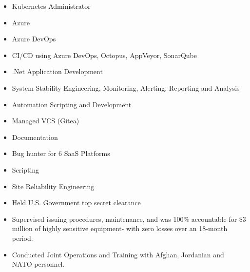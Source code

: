 \documentclass[10pt,a4paper,ragged2e,withhyper]{altacv}
\begin{document}


\makecvheader


\begin{paracol}{2}

\begin{itemize}
\item Kubernetes Administrator  
\item Azure
\item Azure DevOps
\item CI/CD using Azure DevOps, Octopus, AppVeyor, SonarQube
\item .Net Application Development
\item System Stability Engineering, Monitoring, Alerting, Reporting and Analysis
\item Automation Scripting and Development
\item Managed VCS (Gitea)
\item Documentation
\end{itemize}

\divider

\begin{itemize}
\item Bug hunter for 6 SaaS Platforms
\item Scripting
\item Site Reliability Engineering
\end{itemize}

\divider

\begin{itemize}
\item Held U.S. Government top secret clearance
\item Supervised issuing procedures, maintenance, and was 100\% accountable for \$3 million of highly sensitive equipment- with zero losses over an 18-month period.
\item Conducted Joint Operations and Training with Afghan, Jordanian and NATO personnel. 
\end{itemize}


\end{paracol}
\end{document}
